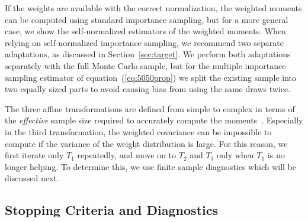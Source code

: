 \documentclass[12pt]{article}
\begin{document}
If the weights are available with the correct normalization, the weighted moments can be computed using
standard importance sampling, but for a more general case, we show the self-normalized estimators of the weighted moments.
When relying on self-normalized importance sampling, we recommend two separate adaptations,
as discussed in Section~\ref{sec:target}.
We
perform both adaptations separately with the full Monte Carlo sample, but for
the multiple importance sampling estimator of equation~(\ref{eq:5050prop}) we
split the existing sample into two equally sized parts to avoid causing bias from using the same draws twice.

%
%
%
%
%









The three affine transformations are defined from simple to complex in terms of the \emph{effective} sample size
required to accurately compute the moments~\citep{kong1992note,martino2017effective,chatterjee2018sample,elvira2018rethinking}. Especially in the third transformation,
the weighted covariance can be impossible to compute if the variance of the weight distribution is large.
For this reason, we first iterate only $T_1$ repeatedly, and move on to $T_2$ and $T_3$
only when $T_1$ is no longer helping.
To determine this, we use finite sample diagnostics which will be discussed next.











































\subsection{Stopping Criteria and Diagnostics} \label{sec:diagnostics}
\end{document}
